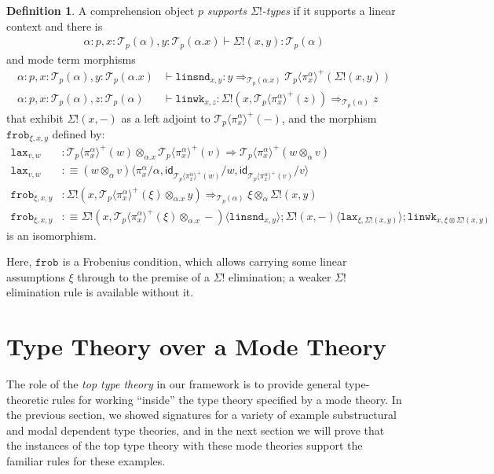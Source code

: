 \documentclass[10pt]{article}
\theoremstyle{definition}
\newtheorem{definition}{Definition}
\newcommand{\yields}{\vdash}
\newcommand{\tcell}{\Rightarrow}
\newcommand{\id}{\mathsf{id}}
\newcommand\TrPlus[2]{\ensuremath{{#1}^+(#2)}}
\newcommand\El[2]{\mathcal{T}_{#1}(#2)}
\newcommand\ApEl[2]{\mathcal{T}_{#1}\langle#2\rangle}
\newcommand\ap[2]{\ensuremath{#1 \langle #2 \rangle }}
\newcommand{\linsnd}[1]{\mathtt{linsnd}_{#1}}
\newcommand{\linwk}[1]{\mathtt{linwk}_{#1}}
\newcommand{\frob}[1]{\mathtt{frob}_{#1}}
\begin{document}
\begin{definition}
A comprehension object $p$ \emph{supports $\Sigma!$-types} if it supports a linear context and there is
\begin{align*}
\alpha : p, x : \El{p}{\alpha}, y : \El{p}{\alpha.x} \yields \Sigma!(x,y) : \El{p}{\alpha}
\end{align*}
and mode term morphisms
\begin{align*}
\alpha : p, x : \El{p}{\alpha}, y : \El{p}{\alpha.x} &\yields \linsnd{x,y} : y \tcell_{\El{p}{\alpha.x}} \TrPlus{\ApEl{p}{\pi^\alpha_x}}{\Sigma!(x,y)} \\
\alpha : p, x : \El{p}{\alpha}, z : \El{p}{\alpha} &\yields \linwk{x,z} : \Sigma!(x, \TrPlus{\ApEl{p}{\pi^\alpha_x}}{z}) \tcell_{\El{p}{\alpha}} z
\end{align*}
that exhibit $\Sigma!(x,-)$ as a left adjoint to $\TrPlus{\ApEl{p}{\pi^\alpha_x}}{-}$, and the morphism $\frob{\xi, x, y}$ defined by:
\begin{align*}
\mathtt{lax}_{v,w} &: \TrPlus{\ApEl{p}{\pi^\alpha_x}}{w} \otimes_{\alpha.x} \TrPlus{\ApEl{p}{\pi^\alpha_x}}{v} \tcell \TrPlus{\ApEl{p}{\pi^\alpha_x}}{w \otimes_\alpha v} \\
\mathtt{lax}_{v,w} &:\equiv \ap{(w \otimes_\alpha v)}{\pi^\alpha_x / \alpha, \id_{\TrPlus{\ApEl{p}{\pi^\alpha_x}}{w}}/w, \id_{\TrPlus{\ApEl{p}{\pi^\alpha_x}}{v}}/v} \\
\frob{\xi, x, y} &: \Sigma!(x, \TrPlus{\ApEl{p}{\pi^\alpha_x}}{\xi} \otimes_{\alpha.x} y) \tcell_{\El{p}{\alpha}} \xi \otimes_\alpha \Sigma!(x, y) \\
\frob{\xi, x, y} &:\equiv \ap{\Sigma!(x, \TrPlus{\ApEl{p}{\pi^\alpha_x}}{\xi} \otimes_{\alpha.x} -)}{\linsnd{x,y}} ; \ap{\Sigma!(x, -)}{\mathtt{lax}_{\xi, \Sigma!(x,y)}} ; \linwk{x, \xi \otimes \Sigma!(x,y)}
\end{align*}
is an isomorphism.
\end{definition}
Here, $\frob{}$ is a Frobenius condition, which allows carrying some
linear assumptions $\xi$ through to the premise of a $\Sigma!$
elimination; a weaker $\Sigma!$ elimination rule is available without
it.


\section{Type Theory over a Mode Theory}
\label{sec:top-syntax}

The role of the \emph{top type theory} in our framework is to provide
general type-theoretic rules for working ``inside'' the type theory
specified by a mode theory.  In the previous section, we showed
signatures for a variety of example substructural and modal dependent
type theories, and in the next section we will prove that the instances
of the top type theory with these mode theories support the familiar
rules for these examples.
\end{document}

